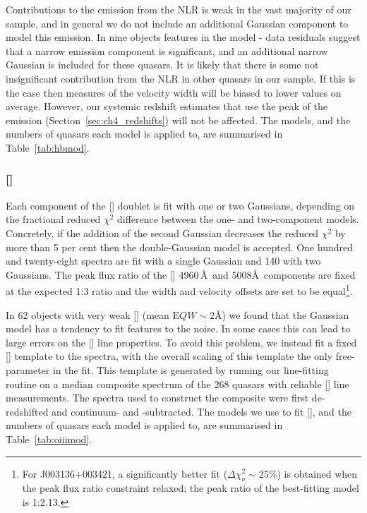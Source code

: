 Contributions to the \hb emission from the NLR is weak in the vast majority of our sample, and in general we do not include an additional Gaussian component to model this emission. 
In nine objects features in the model - data residuals suggest that a narrow emission component is significant, and an additional narrow Gaussian is included for these quasars. 
It is likely that there is some not insignificant contribution from the NLR in other quasars in our sample. 
If this is the case then measures of the \hb velocity width will be biased to lower values on average. 
However, our systemic redshift estimates that use the peak of the \hb emission (Section~\ref{sec:ch4_redshifts}) will not be affected. 
The \hb models, and the numbers of quasars each model is applied to, are summarised in Table~\ref{tab:hbmod}. 

\subsubsection{[]}

Each component of the [] doublet is fit with one or two Gaussians, depending on the fractional reduced $\chi^2$ difference between the one- and two-component models. 
Concretely, if the addition of the second Gaussian decreases the reduced $\chi^2$ by more than 5 per cent then the double-Gaussian model is accepted.
One hundred and twenty-eight spectra are fit with a single Gaussian and 140 with two Gaussians. 
The peak flux ratio of the [] 4960\,\AA\, and 5008\AA\, components are fixed at the expected 1:3 ratio and the width and velocity offsets are set to be equal\footnote{For J003136+003421, a significantly better fit ($\Delta \chi^2_{\nu} \sim 25\%$) is obtained when the peak flux ratio constraint relaxed; the peak ratio of the best-fitting model is 1:2.13.}.

In 62 objects with very weak [] (mean ${\mathrm EQW}\sim2$\AA) we found that the Gaussian model has a tendency to fit features to the noise. 
In some cases this can lead to large errors on the [] line properties. 
To avoid this problem, we instead fit a fixed [] template to the spectra, with the overall scaling of this template the only free-parameter in the fit.
This template is generated by running our line-fitting routine on a median composite spectrum of the 268 quasars with reliable [] line measurements.  
The spectra used to construct the composite were first de-redshifted and continuum- and -subtracted.  
The models we use to fit [], and the numbers of quasars each model is applied to, are summarised in Table~\ref{tab:oiiimod}.

